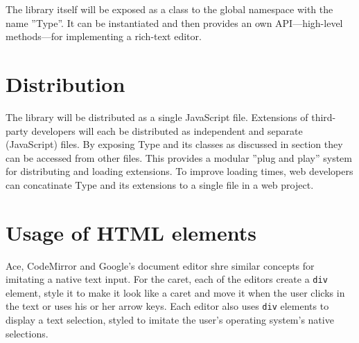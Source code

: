 The library itself will be exposed as a class to the global namespace with the name ''Type''. It can be instantiated and then provides an own API---high-level methods---for implementing a rich-text editor.




\section{Distribution}

The library will be distributed as a single JavaScript file. Extensions of third-party developers will each be distributed as independent and separate (JavaScript) files. By exposing Type and its classes as discussed in section  they can be accessed from other files. This provides a modular ''plug and play'' system for distributing and loading extensions. To improve loading times, web developers can concatinate Type and its extensions to a single file in a web project.

\section{Usage of HTML elements}

Ace, CodeMirror and Google's document editor shre similar concepts for imitating a native text input. For the caret, each of the editors create a \texttt{div} element, style it to make it look like a caret and move it when the user clicks in the text or uses his or her arrow keys. Each editor also uses \texttt{div} elements to display a text selection, styled to imitate the user's operating system's native selections. %

